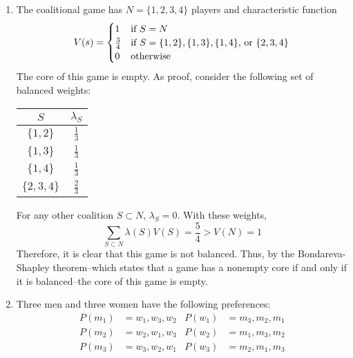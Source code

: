 \documentclass[11pt]{article}
\begin{document}
\begin{enumerate}
\begin{enumerate}
	\end{enumerate}
	\item The coalitional game has \( N = \{1,2,3,4\} \) players and characteristic function
	\[V(s) = \begin{cases}
		1 & \text{if \( S = N \)} \\
		\frac{3}{4} & \text{if \( S = \{1,2\}, \{1,3\}, \{1,4\}, \) or \( \{2,3,4\} \)} \\
		0 & \text{otherwise}
	\end{cases}\]
	The core of this game is empty. As proof, consider the following set of balanced weights: 
	\begin{table}[!h]
		\centering
		\begin{tabular}{c | c }
			\( S \) & \( \lambda_S \) \\ \hline
			\( \{1,2\} \) & \( \frac{1}{3} \) \\
			\( \{1,3\} \) & \( \frac{1}{3} \) \\
			\( \{1,4\} \) & \( \frac{1}{3} \) \\
			\( \{2,3,4\} \) & \( \frac{2}{3} \)\\
		\end{tabular}
	\end{table}

	For any other coalition \( S\subset N \), \( \lambda_S = 0 \). With these weights, 
	\[\sum_{S\subset N} \lambda(S) V(S) = \frac{5}{4} > V(N) = 1\]
	Therefore, it is clear that this game is not balanced. Thus, by the Bondareva-Shapley theorem--which states that a game has a nonempty core if and only if it is balanced--the core of this game is empty. 

	\item Three men and three women have the following preferences:
	\begin{align*}
		P(m_1) &= w_1, w_3, w_2 & P(w_1) &= m_3, m_2, m_1 \\
		P(m_2) &= w_2, w_1, w_3 & P(w_2) &= m_1, m_3, m_2 \\
		P(m_3) &= w_3, w_2, w_1 & P(w_3) &= m_2, m_1, m_3 \\
	\end{align*}
	

\end{enumerate}
\end{document}
